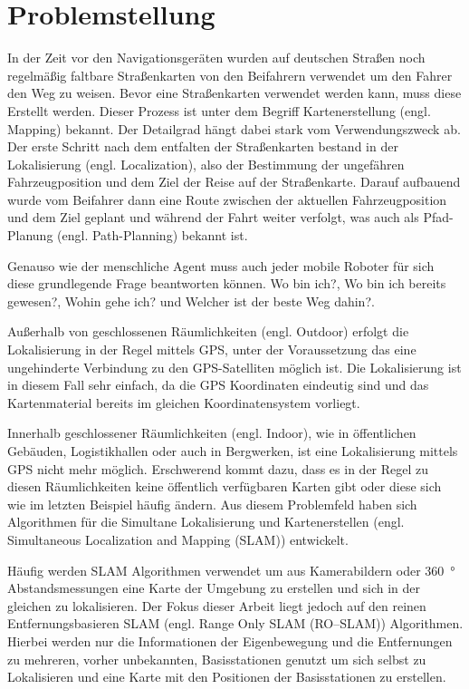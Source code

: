 \section{Problemstellung}
In der Zeit vor den Navigationsgeräten wurden auf deutschen Straßen noch regelmäßig faltbare Straßenkarten von den Beifahrern verwendet um den Fahrer den Weg zu weisen. Bevor eine Straßenkarten verwendet werden kann, muss diese Erstellt werden. Dieser Prozess ist unter dem Begriff Kartenerstellung (engl. Mapping) bekannt. Der Detailgrad hängt dabei stark vom Verwendungszweck ab. Der erste Schritt nach dem entfalten der Straßenkarten bestand in der Lokalisierung (engl. Localization), also der Bestimmung der ungefähren Fahrzeugposition und dem Ziel der Reise auf der Straßenkarte. Darauf aufbauend wurde vom Beifahrer dann eine Route zwischen der aktuellen Fahrzeugposition und dem Ziel geplant und während der Fahrt weiter verfolgt, was auch als Pfad-Planung (engl. Path-Planning) bekannt ist.

Genauso wie der menschliche Agent muss auch jeder mobile Roboter für sich diese grundlegende Frage beantworten können. \glqq Wo bin ich?\grqq{}, \glqq Wo bin ich bereits gewesen?\grqq, \glqq Wohin gehe ich?\grqq{} und \glqq Welcher ist der beste Weg dahin?\grqq{}\cite{murphy2000introduction}.

Außerhalb von geschlossenen Räumlichkeiten (engl. Outdoor) erfolgt die Lokalisierung in der Regel mittels GPS, unter der Voraussetzung das eine ungehinderte Verbindung zu den GPS-Satelliten möglich ist. Die Lokalisierung ist in diesem Fall sehr einfach, da die GPS Koordinaten eindeutig sind und das Kartenmaterial bereits im gleichen Koordinatensystem vorliegt.

Innerhalb geschlossener Räumlichkeiten (engl. Indoor), wie in öffentlichen Gebäuden, Logistikhallen oder auch in Bergwerken, ist eine Lokalisierung mittels GPS nicht mehr möglich. Erschwerend kommt dazu, dass es in der Regel zu diesen Räumlichkeiten keine öffentlich verfügbaren Karten gibt oder diese sich wie im letzten Beispiel häufig ändern. Aus diesem Problemfeld haben sich Algorithmen für die Simultane Lokalisierung und Kartenerstellen (engl. Simultaneous Localization and Mapping (SLAM)) entwickelt.

Häufig werden SLAM Algorithmen verwendet um aus Kamerabildern oder \SI{360}{\degree} Abstandsmessungen eine Karte der Umgebung zu erstellen und sich in der gleichen zu lokalisieren. Der Fokus dieser Arbeit liegt jedoch auf den reinen Entfernungsbasieren SLAM (engl. Range Only SLAM (RO--SLAM)) Algorithmen. Hierbei werden nur die Informationen der Eigenbewegung und die Entfernungen zu mehreren, vorher unbekannten, Basisstationen genutzt um sich selbst zu Lokalisieren und eine Karte mit den Positionen der Basisstationen zu erstellen.